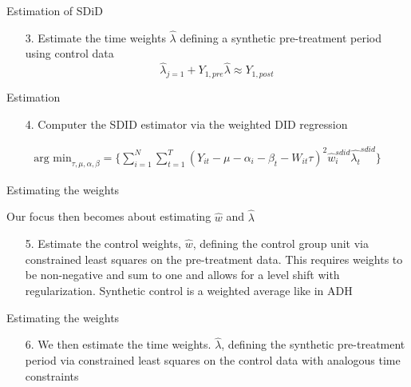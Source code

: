 \documentclass{beamer}
\begin{document}
\begin{frame}{Estimation of SDiD}

	\begin{enumerate}

	\item[3. ] Estimate the time weights $\widehat{\lambda}$ defining a synthetic pre-treatment period using control data$$\widehat{\lambda}_{j=1} + Y_{1,pre} \widehat{\lambda} \approx Y_{1,post}$$
	\end{enumerate}

\end{frame}


\begin{frame}{Estimation}

\begin{enumerate}
\item[4. ] Computer the SDID estimator via the weighted DID regression
\end{enumerate}

\begin{eqnarray*}
\textrm{arg min}_{\tau, \mu, \alpha, \beta} = \bigg \{ \sum_{i=1}^N \sum_{t=1}^T ( Y_{it} - \mu - \alpha_i -\beta_t - W_{it}\tau ) ^2 \widehat{w}_i^{sdid} \widehat{\lambda_t}^{sdid}  \bigg \}
\end{eqnarray*}


\end{frame}

\begin{frame}{Estimating the weights}

Our focus then becomes about estimating $\widehat{w}$ and $\widehat{\lambda}$

\begin{enumerate}
\item[5. ] Estimate the control weights, $\widehat{w}$, defining the control group unit via constrained least squares on the pre-treatment data. This requires weights to be non-negative and sum to one and allows for a level shift with regularization.  Synthetic control is a weighted average like in ADH
\end{enumerate}

\end{frame}


\begin{frame}{Estimating the weights}

\begin{enumerate}

\item[6. ] We then estimate the time weights. $\widehat{\lambda}$, defining the synthetic pre-treatment period via constrained least squares on the control data with analogous time constraints

\end{enumerate}

\end{frame}
\end{document}
